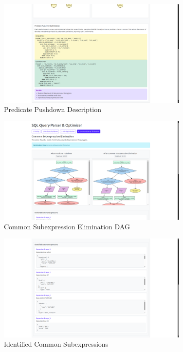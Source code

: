 \documentclass[12pt]{article}
\begin{document}
\begin{figure}[H]
    \centering
    \includegraphics[width=0.85\textwidth]{images/ss4.png}
    \caption{Predicate Pushdown Description}
\end{figure}

\begin{figure}[H]
    \centering
    \includegraphics[width=0.85\textwidth]{images/ss5.png}
    \caption{Common Subexpression Elimination DAG}
\end{figure}

\begin{figure}[H]
    \centering
    \includegraphics[width=0.85\textwidth]{images/ss6.png}
    \caption{Identified Common Subexpressions}
\end{figure}
\end{document}

